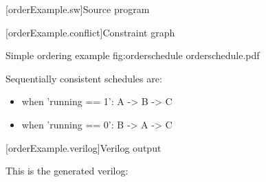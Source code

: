 
[orderExample.sw]{Source program}



[orderExample.conflict]{Constraint graph}

\begin{importgraphic}
{Simple ordering example}
{fig:orderschedule}
{orderschedule.pdf}
\end{importgraphic}

Sequentially consistent schedules are:
\begin{itemize}[noitemsep,topsep=0pt]
\item when 'running == 1': A -> B -> C
\item when 'running == 0': B -> A -> C
\end{itemize}

[orderExample.verilog]{Verilog output}

This is the generated verilog:



